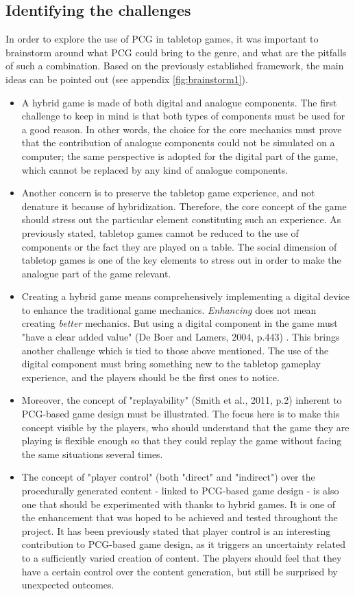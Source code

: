 \subsection{Identifying the challenges}
In order to explore the use of PCG in tabletop games, it was important to brainstorm around what PCG could bring to the genre, and what are the pitfalls of such a combination. Based on the previously established framework, the main ideas can be pointed out (see appendix \ref{fig:brainstorm1}).
\begin{itemize}
\item A hybrid game is made of both digital and analogue components. The first challenge to keep in mind is that both types of components must be used for a good reason. In other words, the choice for the core mechanics must prove that the contribution of analogue components could not be simulated on a computer; the same perspective is adopted for the digital part of the game, which cannot be replaced by any kind of analogue components.  
\item Another concern is to preserve the tabletop game experience, and not denature it because of hybridization. Therefore, the core concept of the game should stress out the particular element constituting such an experience. As previously stated, tabletop games cannot be reduced to the use of components or the fact they are played on a table. The social dimension of tabletop games is one of the key elements to stress out in order to make the analogue part of the game relevant.
\item Creating a hybrid game means comprehensively implementing a digital device to enhance the traditional game mechanics. \textit{Enhancing} does not mean creating \textit{better} mechanics. But using a digital component in the game must "have a clear added value" (De Boer and Lamers, 2004, p.443) \cite{chap:aug}. This brings another challenge which is tied to those above mentioned. The use of the digital component must bring something new to the tabletop gameplay experience, and the players should be the first ones to notice.
\item Moreover, the concept of "replayability" (Smith et al., 2011, p.2) \cite{pdf:pcgbased} inherent to PCG-based game design must be illustrated. The focus here is to make this concept visible by the players, who should understand that the game they are playing is flexible enough so that they could replay the game without facing the same situations several times.
\item The concept of "player control" (both "direct" and "indirect") \cite{pdf:pcgbased} over the procedurally generated content - linked to PCG-based game design - is also one that should be experimented with thanks to hybrid games. It is one of the enhancement that was hoped to be achieved and tested throughout the project. It has been previously stated that player control is an interesting contribution to PCG-based game design, as it triggers an uncertainty related to a sufficiently varied creation of content. The players should feel that they have a certain control over the content generation, but still be surprised by unexpected outcomes.

\end{itemize}

